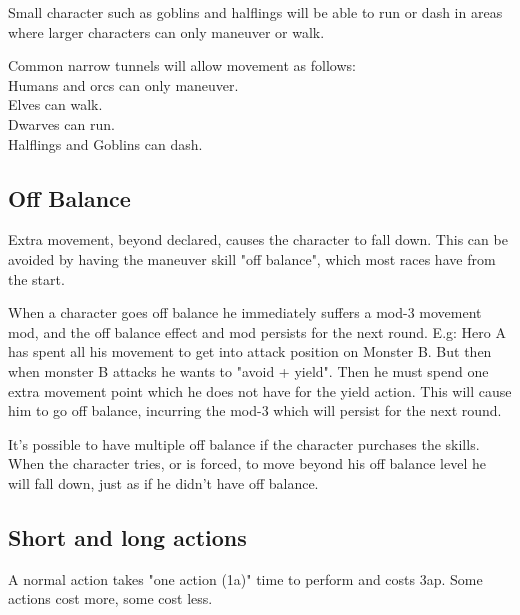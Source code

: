 Small character such as goblins and halflings will be able to run or dash in areas where larger characters can only maneuver or walk.

Common narrow tunnels will allow movement as follows: \\
Humans and orcs can only maneuver. \\
Elves can walk. \\
Dwarves can run. \\
Halflings and Goblins can dash. \\


\subsection*{Off Balance}
Extra movement, beyond declared, causes the character to fall down. This can be avoided by having the maneuver skill "off balance", which most races have from the start.

When a character goes off balance he immediately suffers a mod-3 movement mod, and the off balance effect and mod persists for the next round. E.g: Hero A has spent all his movement to get into attack position on Monster B. But then when monster B attacks he wants to "avoid + yield". Then he must spend one extra movement point which he does not have for the yield action. This will cause him to go off balance, incurring the mod-3 which will persist for the next round.

It's possible to have multiple off balance if the character purchases the skills.
When the character tries, or is forced, to move beyond his off balance level he will fall down, just as if he didn't have off balance.



















\subsection*{Short and long actions}
A normal action takes "one action (1a)" time to perform and costs 3ap. Some actions cost more, some cost less.

